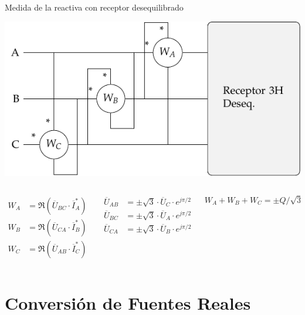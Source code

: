 \documentclass[aspectratio=169, usenames,svgnames,dvipsnames]{beamer}
\begin{document}
\begin{frame}[label={sec:org21a5f92}]{Medida de la reactiva con receptor desequilibrado}
\begin{center}
\includegraphics[height=0.5\textheight]{../figs/Reactiva_3H_deseq.pdf}
\end{center}

\begin{columns}
\begin{column}{0.3\columnwidth}
\begin{align*}
  W_A &= \Re(\overline{U}_{BC} \cdot \overline{I}^*_A)\\
  W_B &= \Re(\overline{U}_{CA} \cdot \overline{I}^*_B)\\
  W_C &= \Re(\overline{U}_{AB} \cdot \overline{I}^*_C)        
\end{align*}
\end{column}
\begin{column}{0.3\columnwidth}
\begin{align*}
  \overline{U}_{AB} &= \pm \sqrt{3} \cdot \overline{U}_C \cdot e^{j\pi/2}\\
  \overline{U}_{BC} &= \pm \sqrt{3} \cdot \overline{U}_A \cdot e^{j\pi/2}\\
  \overline{U}_{CA} &= \pm \sqrt{3} \cdot \overline{U}_B \cdot e^{j\pi/2}
\end{align*}
\end{column}
\begin{column}{0.3\columnwidth}
\[
  \boxed{W_A + W_B + W_C = \pm Q/\sqrt{3}}
\]
\end{column}
\end{columns}
\end{frame}
\section{Conversión de Fuentes Reales}
\label{sec:orga26180e}
\end{document}
